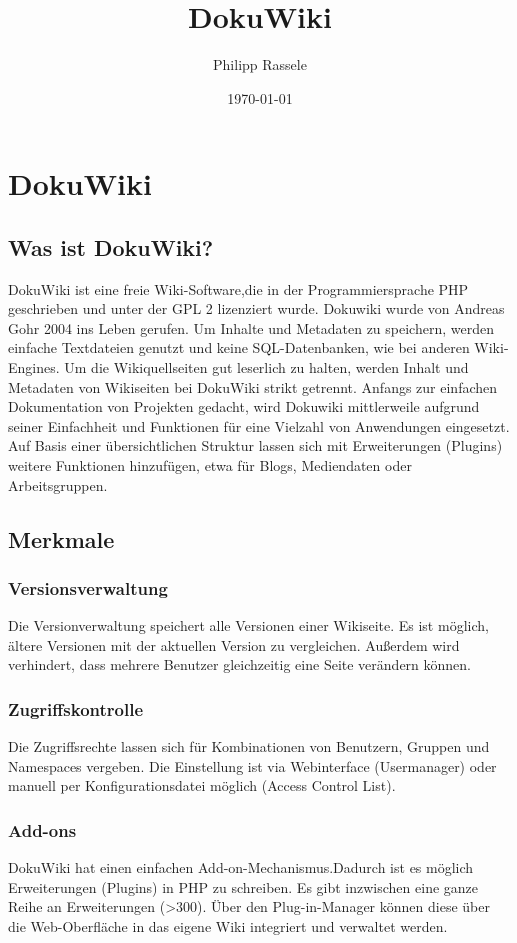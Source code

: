 \documentclass{article}
\title{DokuWiki}
\author{Philipp Rassele}
\date{\today}
\begin{document}
\maketitle

\section{DokuWiki}
\subsection{Was ist DokuWiki?}
DokuWiki ist eine freie Wiki-Software,die in der Programmiersprache PHP geschrieben und unter der GPL 2 lizenziert wurde. Dokuwiki wurde von Andreas Gohr 2004 ins Leben gerufen. Um Inhalte und Metadaten zu speichern, werden einfache Textdateien genutzt und keine SQL-Datenbanken, wie bei anderen Wiki-Engines. Um die Wikiquellseiten gut leserlich zu halten, werden Inhalt und Metadaten von Wikiseiten bei DokuWiki strikt getrennt. Anfangs zur einfachen Dokumentation von Projekten gedacht, wird Dokuwiki mittlerweile aufgrund seiner Einfachheit und Funktionen für eine Vielzahl von Anwendungen eingesetzt. Auf Basis einer übersichtlichen Struktur lassen sich mit Erweiterungen (Plugins) weitere Funktionen hinzufügen, etwa für Blogs, Mediendaten oder Arbeitsgruppen.
\subsection{Merkmale}
\subsubsection{Versionsverwaltung}
Die Versionverwaltung speichert alle Versionen einer Wikiseite. Es ist möglich, ältere Versionen mit der aktuellen Version zu vergleichen. Außerdem wird verhindert, dass mehrere Benutzer gleichzeitig eine Seite verändern können.
\subsubsection{Zugriffskontrolle}
Die Zugriffsrechte lassen sich für Kombinationen von Benutzern, Gruppen und Namespaces vergeben. Die Einstellung ist via Webinterface (Usermanager) oder manuell per Konfigurationsdatei möglich (Access Control List).
\subsubsection{Add-ons}
DokuWiki hat einen einfachen Add-on-Mechanismus.Dadurch ist es möglich Erweiterungen (Plugins) in PHP zu schreiben. Es gibt inzwischen eine ganze Reihe an Erweiterungen (>300). Über den Plug-in-Manager können diese über die Web-Oberfläche in das eigene Wiki integriert und verwaltet werden.
\end{document}
